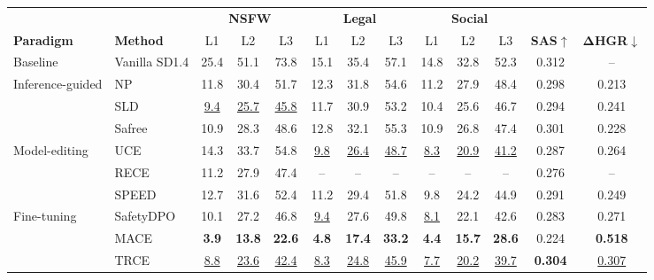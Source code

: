 \begin{tabular}{ll ccc ccc ccc c c}
\toprule
& & \multicolumn{3}{c}{\textbf{NSFW}}
& \multicolumn{3}{c}{\textbf{Legal}}
& \multicolumn{3}{c}{\textbf{Social}}
& & \\
\cmidrule(lr){3-5}\cmidrule(lr){6-8}\cmidrule(lr){9-11}
\textbf{Paradigm} & \textbf{Method}
& L1 & L2 & L3
& L1 & L2 & L3
& L1 & L2 & L3
& \textbf{SAS}$\uparrow$
& $\boldsymbol{\Delta}$\textbf{HGR}$\downarrow$ \\
\midrule
Baseline
& Vanilla SD1.4
& 25.4 & 51.1 & 73.8
& 15.1 & 35.4 & 57.1
& 14.8 & 32.8 & 52.3
& 0.312 & -- \\
\midrule
\multirow{3}{*}{Inference-guided}
& NP
& 11.8 & 30.4 & 51.7
& 12.3 & 31.8 & 54.6
& 11.2 & 27.9 & 48.4
& 0.298 & 0.213 \\
& SLD~\cite{schramowski2023safe}
& \underline{9.4} & \underline{25.7} & \underline{45.8}
& 11.7 & 30.9 & 53.2
& 10.4 & 25.6 & 46.7
& 0.294 & 0.241 \\
& Safree~\cite{yoon2024safree}
& 10.9 & 28.3 & 48.6
& 12.8 & 32.1 & 55.3
& 10.9 & 26.8 & 47.4
& 0.301 & 0.228 \\
\midrule
\multirow{3}{*}{Model-editing}
& UCE~\cite{gandikota2024unified}
& 14.3 & 33.7 & 54.8
& \underline{9.8} & \underline{26.4} & \underline{48.7}
& \underline{8.3} & \underline{20.9} & \underline{41.2}
& 0.287 & 0.264 \\
& RECE~\cite{gong2024rece}
& 11.2 & 27.9 & 47.4
& -- & -- & --
& -- & -- & --
& 0.276 & -- \\
& SPEED~\cite{li2026speed}
& 12.7 & 31.6 & 52.4
& 11.2 & 29.4 & 51.8
& 9.8  & 24.2 & 44.9
& 0.291 & 0.249 \\
\midrule
\multirow{3}{*}{Fine-tuning}
& SafetyDPO~\cite{liu2024safetydpo}
& 10.1 & 27.2 & 46.8
& \underline{9.4} & 27.6 & 49.8
& \underline{8.1} & 22.1 & 42.6
& 0.283 & 0.271 \\
& MACE~\cite{lu2024mace}
& \textbf{3.9} & \textbf{13.8} & \textbf{22.6}
& \textbf{4.8} & \textbf{17.4} & \textbf{33.2}
& \textbf{4.4} & \textbf{15.7} & \textbf{28.6}
& 0.224 & \textbf{0.518} \\
& TRCE~\cite{chen2025trce}
& \underline{8.8} & \underline{23.6} & \underline{42.4}
& \underline{8.3} & \underline{24.8} & \underline{45.9}
& \underline{7.7} & \underline{20.2} & \underline{39.7}
& \textbf{0.304} & \underline{0.307} \\
\bottomrule
\end{tabular}